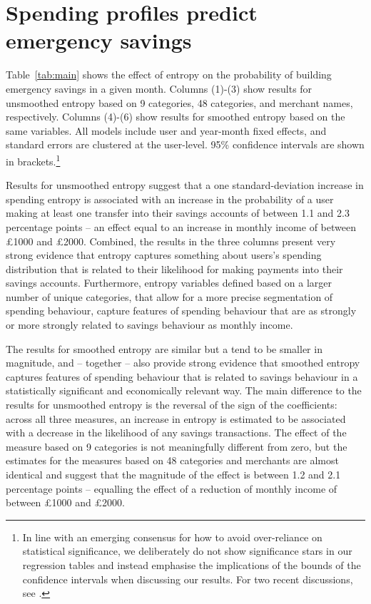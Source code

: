 
\section{Spending profiles predict emergency savings}%
\label{sec:results}

Table~\ref{tab:main} shows the effect of entropy on the probability of building
emergency savings in a given month. Columns (1)-(3) show results for unsmoothed
entropy based on 9 categories, 48 categories, and merchant names, respectively.
Columns (4)-(6) show results for smoothed entropy based on the same variables.
All models include user and year-month fixed effects, and standard errors are
clustered at the user-level. 95\% confidence intervals are shown in
brackets.\footnote{In line with an emerging consensus for how to avoid
    over-reliance on statistical significance, we deliberately do not show
    significance stars in our regression tables and instead emphasise the
    implications of the bounds of the confidence intervals when discussing our
    results. For two recent discussions, see \citet{imbens2021statistical,
romer2020praise}.}

Results for unsmoothed entropy suggest that a one standard-deviation increase
in spending entropy is associated with an increase in the probability of a user
making at least one transfer into their savings accounts of between 1.1 and 2.3
percentage points -- an effect equal to an increase in monthly income of
between \pounds1000 and \pounds2000. Combined, the results in the three columns
present very strong evidence that entropy captures something about users's
spending distribution that is related to their likelihood for making payments
into their savings accounts. Furthermore, entropy variables defined based on a
larger number of unique categories, that allow for a more precise segmentation
of spending behaviour, capture features of spending behaviour that are as
strongly or more strongly related to savings behaviour as monthly income.

The results for smoothed entropy are similar but a tend to be smaller in
magnitude, and -- together -- also provide strong evidence that smoothed
entropy captures features of spending behaviour that is related to savings
behaviour in a statistically significant and economically relevant way. The
main difference to the results for unsmoothed entropy is the reversal of the
sign of the coefficients: across all three measures, an increase in entropy is
estimated to be associated with a decrease in the likelihood of any savings
transactions. The effect of the measure based on 9 categories is not
meaningfully different from zero, but the estimates for the measures based on
48 categories and merchants are almost identical and suggest that the magnitude
of the effect is between 1.2 and 2.1 percentage points -- equalling the effect
of a reduction of monthly income of between \pounds1000 and \pounds2000.

